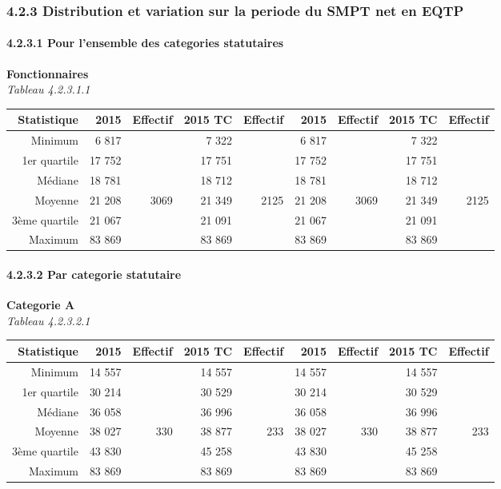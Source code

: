 \hypertarget{distribution-et-variation-sur-la-periode-du-smpt-net-en-eqtp}{%
\subsubsection{4.2.3 Distribution et variation sur la periode du SMPT
net en
EQTP}\label{distribution-et-variation-sur-la-periode-du-smpt-net-en-eqtp}}

\hypertarget{pour-lensemble-des-categories-statutaires}{%
\paragraph{4.2.3.1 Pour l'ensemble des categories
statutaires}\label{pour-lensemble-des-categories-statutaires}}

\textbf{Fonctionnaires}\\
\hspace*{0.333em}\emph{Tableau 4.2.3.1.1}

\begin{longtable}[]{@{}rrrrrrrrr@{}}
\toprule
Statistique & 2015 & Effectif & 2015 TC & Effectif & 2015 & Effectif &
2015 TC & Effectif\tabularnewline
\midrule
\endhead
Minimum & 6 817 & & 7 322 & & 6 817 & & 7 322 &\tabularnewline
1er quartile & 17 752 & & 17 751 & & 17 752 & & 17 751 &\tabularnewline
Médiane & 18 781 & & 18 712 & & 18 781 & & 18 712 &\tabularnewline
Moyenne & 21 208 & 3069 & 21 349 & 2125 & 21 208 & 3069 & 21 349 &
2125\tabularnewline
3ème quartile & 21 067 & & 21 091 & & 21 067 & & 21 091 &\tabularnewline
Maximum & 83 869 & & 83 869 & & 83 869 & & 83 869 &\tabularnewline
\bottomrule
\end{longtable}

\hypertarget{par-categorie-statutaire-1}{%
\paragraph{4.2.3.2 Par categorie
statutaire}\label{par-categorie-statutaire-1}}

\textbf{Categorie A}\\
\hspace*{0.333em}\emph{Tableau 4.2.3.2.1}

\begin{longtable}[]{@{}rrrrrrrrr@{}}
\toprule
Statistique & 2015 & Effectif & 2015 TC & Effectif & 2015 & Effectif &
2015 TC & Effectif\tabularnewline
\midrule
\endhead
Minimum & 14 557 & & 14 557 & & 14 557 & & 14 557 &\tabularnewline
1er quartile & 30 214 & & 30 529 & & 30 214 & & 30 529 &\tabularnewline
Médiane & 36 058 & & 36 996 & & 36 058 & & 36 996 &\tabularnewline
Moyenne & 38 027 & 330 & 38 877 & 233 & 38 027 & 330 & 38 877 &
233\tabularnewline
3ème quartile & 43 830 & & 45 258 & & 43 830 & & 45 258 &\tabularnewline
Maximum & 83 869 & & 83 869 & & 83 869 & & 83 869 &\tabularnewline
\bottomrule
\end{longtable}

